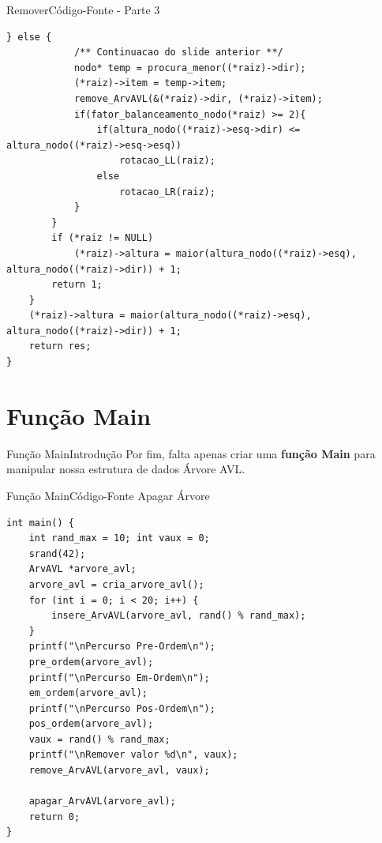 \documentclass[aspectratio=169]{beamer}
\begin{document}
\begin{frame}[fragile]{Remover}{Código-Fonte - Parte 3}
\begin{lstlisting}[style=CStyle,basicstyle=\tiny,firstnumber=36]
        } else { 
            /** Continuacao do slide anterior **/  		
            nodo* temp = procura_menor((*raiz)->dir);
            (*raiz)->item = temp->item;
            remove_ArvAVL(&(*raiz)->dir, (*raiz)->item);
            if(fator_balanceamento_nodo(*raiz) >= 2){
                if(altura_nodo((*raiz)->esq->dir) <= altura_nodo((*raiz)->esq->esq))
                    rotacao_LL(raiz);
                else
                    rotacao_LR(raiz);
            }
        }
        if (*raiz != NULL)
            (*raiz)->altura = maior(altura_nodo((*raiz)->esq), altura_nodo((*raiz)->dir)) + 1;
        return 1;
    }
    (*raiz)->altura = maior(altura_nodo((*raiz)->esq), altura_nodo((*raiz)->dir)) + 1;
    return res;
}
\end{lstlisting}  
\end{frame}


%

\section{Função Main}

\begin{frame}{Função Main}{Introdução}
Por fim, falta apenas criar uma {\bf função Main} para manipular nossa estrutura de dados Árvore AVL.
\end{frame}


\begin{frame}[fragile]{Função Main}{Código-Fonte Apagar Árvore}
\begin{lstlisting}[style=CStyle,basicstyle=\tiny]
int main() {
    int rand_max = 10; int vaux = 0;
    srand(42);
    ArvAVL *arvore_avl;
    arvore_avl = cria_arvore_avl();
    for (int i = 0; i < 20; i++) {
        insere_ArvAVL(arvore_avl, rand() % rand_max);
    }
    printf("\nPercurso Pre-Ordem\n");
    pre_ordem(arvore_avl);
    printf("\nPercurso Em-Ordem\n");
    em_ordem(arvore_avl);
    printf("\nPercurso Pos-Ordem\n");
    pos_ordem(arvore_avl);
    vaux = rand() % rand_max;
    printf("\nRemover valor %d\n", vaux);
    remove_ArvAVL(arvore_avl, vaux);

    apagar_ArvAVL(arvore_avl);
    return 0;
}
\end{lstlisting}  
\end{frame}
\end{document}
